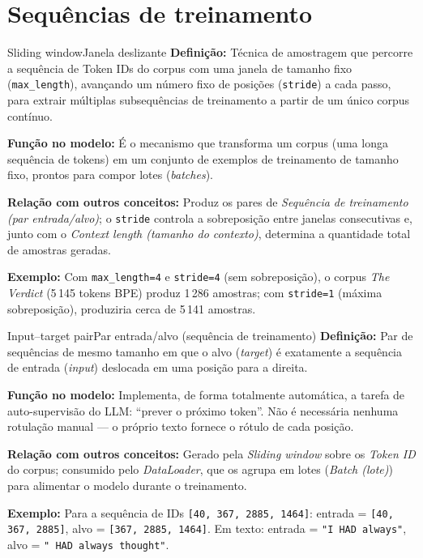 \documentclass[11pt,a4paper]{article}
\newcommand{\campo}[2]{\textbf{\textcolor{accentblue}{#1:}} #2\par\smallskip}
\begin{document}
\section{Sequências de treinamento}

\begin{termo}{Sliding window}{Janela deslizante}
\campo{Definição}{Técnica de amostragem que percorre a sequência de Token IDs do corpus
com uma janela de tamanho fixo (\texttt{max\_length}), avançando um número fixo de
posições (\texttt{stride}) a cada passo, para extrair múltiplas subsequências de
treinamento a partir de um único corpus contínuo.}
\campo{Função no modelo}{É o mecanismo que transforma um corpus (uma longa sequência de
tokens) em um conjunto de exemplos de treinamento de tamanho fixo, prontos para compor
lotes (\emph{batches}).}
\campo{Relação com outros conceitos}{Produz os pares de \emph{Sequência de
treinamento (par entrada/alvo)}; o \texttt{stride} controla a sobreposição entre
janelas consecutivas e, junto com o \emph{Context length (tamanho do contexto)},
determina a quantidade total de amostras geradas.}
\campo{Exemplo}{Com \texttt{max\_length=4} e \texttt{stride=4} (sem sobreposição), o
corpus \emph{The Verdict} (5\,145 tokens BPE) produz 1\,286 amostras; com
\texttt{stride=1} (máxima sobreposição), produziria cerca de 5\,141 amostras.}
\end{termo}

\begin{termo}{Input--target pair}{Par entrada/alvo (sequência de treinamento)}
\campo{Definição}{Par de sequências de mesmo tamanho em que o alvo (\emph{target}) é
exatamente a sequência de entrada (\emph{input}) deslocada em uma posição para a
direita.}
\campo{Função no modelo}{Implementa, de forma totalmente automática, a tarefa de
auto-supervisão do LLM: ``prever o próximo token''. Não é necessária nenhuma rotulação
manual --- o próprio texto fornece o rótulo de cada posição.}
\campo{Relação com outros conceitos}{Gerado pela \emph{Sliding window} sobre os
\emph{Token ID} do corpus; consumido pelo \emph{DataLoader}, que os agrupa em
lotes (\emph{Batch (lote)}) para alimentar o modelo durante o treinamento.}
\campo{Exemplo}{Para a sequência de IDs \texttt{[40, 367, 2885, 1464]}: entrada =
\texttt{[40, 367, 2885]}, alvo = \texttt{[367, 2885, 1464]}. Em texto:
entrada = \texttt{"I HAD always"}, alvo = \texttt{" HAD always thought"}.}
\end{termo}
\end{document}
